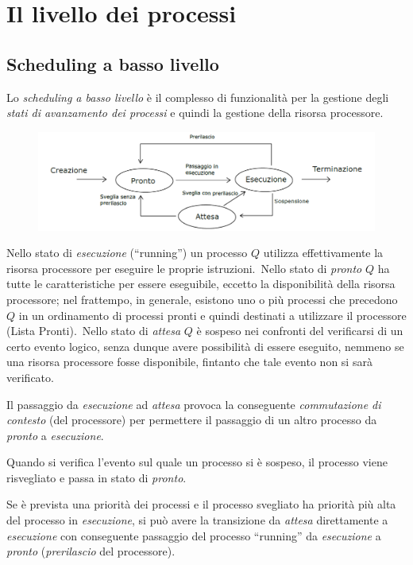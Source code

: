 \chapter{Il livello dei processi}

\section{Scheduling a basso livello}

Lo \textit{scheduling a basso livello} è il complesso di funzionalità per la gestione degli \textit{stati di avanzamento dei processi} e quindi la gestione della risorsa processore.

\begin{figure}[H]
    \centering
    \includegraphics[width=\textwidth]{immagini/Scheduler.png}
\end{figure}

\noindent Nello stato di \textit{esecuzione} (``running'') un processo $Q$ utilizza effettivamente la risorsa processore per eseguire le proprie istruzioni.\
Nello stato di \textit{pronto} $Q$ ha tutte le caratteristiche per essere eseguibile, eccetto la disponibilità della risorsa processore; nel frattempo, in generale, esistono uno o più processi che precedono $Q$ in un ordinamento di processi pronti e quindi destinati a utilizzare il processore (Lista Pronti).\
Nello stato di \textit{attesa} $Q$ è sospeso nei confronti del verificarsi di un certo evento logico, senza dunque avere possibilità di essere eseguito, nemmeno se una risorsa processore fosse disponibile, fintanto che tale evento non si sarà verificato.

Il passaggio da \textit{esecuzione} ad \textit{attesa} provoca la conseguente \textit{commutazione di contesto} (del processore) per permettere il passaggio di un altro processo da \textit{pronto} a \textit{esecuzione}.

Quando si verifica l'evento sul quale un processo si è sospeso, il processo viene risvegliato e passa in stato di \textit{pronto}.

Se è prevista una priorità dei processi e il processo svegliato ha priorità più alta del processo in \textit{esecuzione}, si può avere la transizione da \textit{attesa} direttamente a \textit{esecuzione} con conseguente passaggio del processo ``running'' da \textit{esecuzione} a \textit{pronto} (\textit{prerilascio} del processore).

